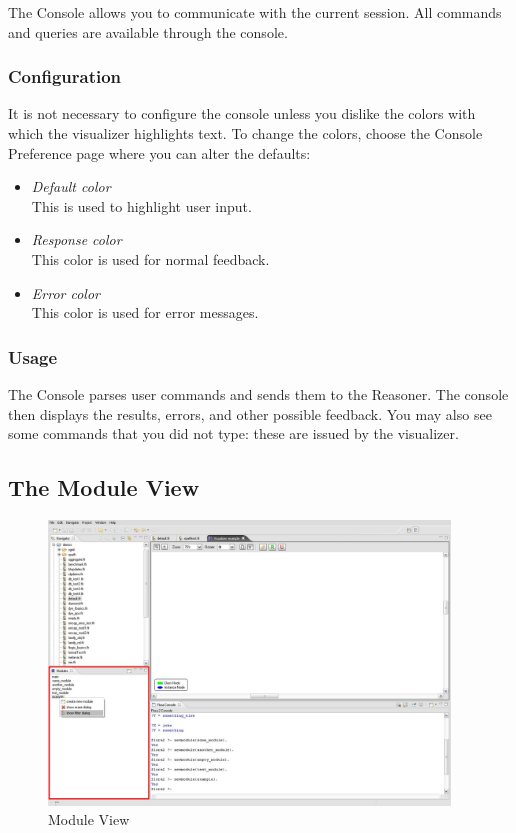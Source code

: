 The \FVIZ Console allows you to communicate with the current \FLORA session.
All \FLORA commands and queries are available through the console.

\subsubsection{Configuration}
\label{sec:consoleview_configuration}

It is not necessary to configure the console unless you dislike the colors
with which the visualizer highlights text. To change the colors, choose
the \FLORA Console Preference page where you can alter the defaults:
\begin{itemize}
\item \emph{Default color}  \\
This is used to highlight user input.
\item \emph{Response color}  \\
  This color is used for normal \FLORA feedback.
\item \emph{Error color} \\
  This color is used for error messages.
\end{itemize}

\subsubsection{Usage}
\label{sec:consoleview_usage}

The \FVIZ Console
parses user commands and sends them to the \FVIZ Reasoner.
The console then displays the results, errors, and other possible feedback.
You may also see some commands that you did not type: these are
issued by the visualizer.

\subsection{The \FVIZ Module View}
\label{sec:moduleview}

\begin{figure}[tbh]
	\centering
		\includegraphics[width=0.95\textwidth]{fviz_module}
	\caption{\FVIZ Module View}
	\label{fig:fviz_module}
\end{figure}

